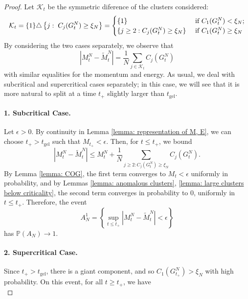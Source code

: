   \begin{proof} Let $\mathcal{K}_t$ be the symmetric diference of the clusters considered: \begin{equation}
      \mathcal{K}_t=\{1\}\triangle\left\{j: \hspace{0.1cm}C_j(G^N_t)\ge \xi_N \right\}=\begin{cases} \{1\} & \text{ if } C_1(G^N_t)< \xi_N; \\ \{j\ge 2: C_j(G^N_t) \ge \xi_N\} & \text{ if } C_1(G^N_t) \ge \xi_N \end{cases}  
  \end{equation} By considering the two cases separately, we observe that \begin{equation}
          \left|M^N_t-\widetilde{M}^N_t\right|=\frac{1}{N}\sum_{j\in\mathcal{K}_t} C_j(G^N_t) 
      \end{equation} with similar equalities for the momentum and energy. As usual, we deal with subcritical and supercritical cases separately; in this case, we will see that it is more natural to split at a time $t_+$ slightly larger than $t_\mathrm{gel}.$\paragraph{1. Subcritical Case.} Let $\epsilon>0$. By continuity in Lemma \ref{lemma: representation of M, E}, we can choose $t_+>t_\text{gel}$ such that $M_{t_+}<\epsilon.$ Then, for $t\le t_+$, we bound \begin{equation}
          \left|M^N_t-\widetilde{M}^N_t\right| \le M^N_t +\frac{1}{N}\sum_{j\ge 2: C_j(G^N_t)\ge \xi_N} C_j(G^N_t).
      \end{equation} By Lemma \ref{lemma: COG}, the first term converges to $M_t <\epsilon$ uniformly in probability, and by Lemmas \ref{lemma: anomalous clusters}, \ref{lemma: large clusters below criticality}, the second term converges in probability to $0$, uniformly in $t\le t_+$. Therefore, the event \begin{equation}
          A^1_N=\left\{\sup_{t\le t_+} \left|M^N_t-\widetilde{M}^N_t\right|<\epsilon\right\}
      \end{equation} has $\mathbb{P}(A_N)\rightarrow 1.$ \paragraph{2. Supercritical Case.} Since $t_+>t_\text{gel}$, there is a giant component, and so $C_1(G^N_{t_+})>\xi_N$ with high probability. On this event, for all $t\ge t_+$, we have \begin{equation}

\end{equation}
\end{proof}
